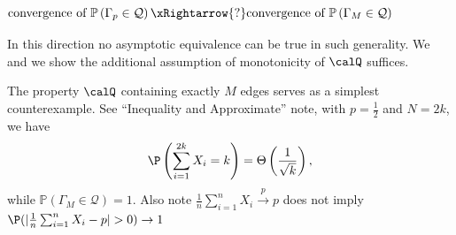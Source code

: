\documentclass{article}
\begin{document}
\subsubsection{$\text{convergence of } \mathbb{P}\left(\Gamma_{p} \in \mathcal{Q}\right) \xRightarrow{?}\text{convergence of }\mathbb{P}\left(\Gamma_{M} \in \mathcal{Q}\right)$ }
In this direction no asymptotic equivalence can be true in such generality. We  and we show the additional assumption of monotonicity of $\calQ$ suffices. 
\begin{rema}
The property $\calQ$ containing exactly $M$ edges serves as a simplest counterexample. See ``Inequality and Approximate'' note, with $p=\frac{1}{2}$ and $N=2k$, we have
$$\P \left(\sum_{i=1}^{2k} X_{i}=k\right)=\Theta\left(\frac{1}{\sqrt{k}}\right),$$
while $\mathbb{P}\left(\Gamma_{M} \in \mathcal{Q}\right)=1$. Also note  $\frac{1}{n}\sum_{i=1}^{n} X_i\xrightarrow{p} p$ does not imply $\P(|\frac{1}{n}\sum_{i=1}^{n} X_i- p|>0)\to 1$
\end{rema}
\end{document}
